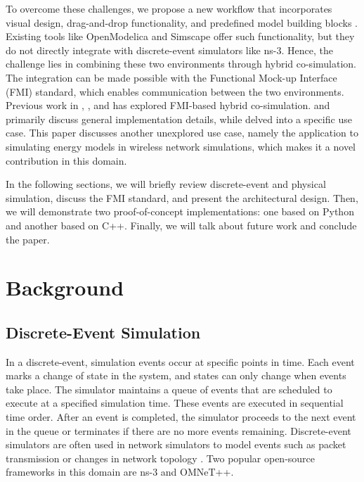 \documentclass[conference]{IEEEtran}
\def\ns3{ns-3}
\begin{document}
To overcome these challenges, we propose a new workflow that incorporates visual design, drag-and-drop functionality, and predefined model building blocks \cite{carreira2020foundations}. Existing tools like OpenModelica and Simscape offer such functionality, but they do not directly integrate with discrete-event simulators like \ns3. Hence, the challenge lies in combining these two environments through hybrid co-simulation.
The integration can be made possible with the Functional Mock-up Interface (FMI) standard, which enables communication between the two environments.
Previous work in \cite{cremona2019hybrid}, \cite{cremona2016step}, and \cite{widl2015fmi} has explored FMI-based hybrid co-simulation. \cite{cremona2019hybrid} and \cite{cremona2016step} primarily discuss general implementation details, while \cite{widl2015fmi} delved into a specific use case.
This paper discusses another unexplored use case, namely the application to simulating energy models in wireless network simulations, which makes it a novel contribution in this domain.

In the following sections, we will briefly review discrete-event and physical simulation, discuss the FMI standard, and present the architectural design.
Then, we will demonstrate two proof-of-concept implementations: one based on Python and another based on C++.
Finally, we will talk about future work and conclude the paper.

\section{Background}
\label{section:background}

\subsection{Discrete-Event Simulation}

In a discrete-event, simulation events occur at specific points in time.
Each event marks a change of state in the system, and states can only change when events take place. 
The simulator maintains a queue of events that are scheduled to execute at a specified simulation time.
These events are executed in sequential time order.
After an event is completed, the simulator proceeds to the next event in the queue or terminates if there are no more events remaining.
Discrete-event simulators are often used in network simulators to model events such as
packet transmission or changes in network topology \cite{riley2010ns}.
Two popular open-source frameworks in this domain are \ns3 and OMNeT++.
\end{document}
